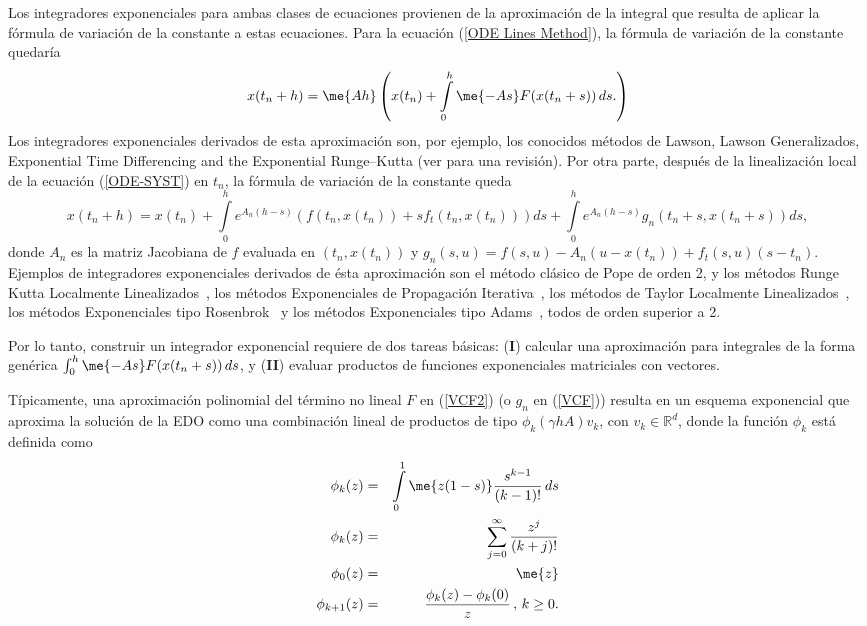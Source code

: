 Los integradores exponenciales para ambas clases de ecuaciones provienen de la aproximaci\'on de la integral
que resulta de aplicar la f\'ormula de variaci\'on de la constante a estas ecuaciones. Para la ecuaci\'on (\ref{ODE Lines Method}), la f\'ormula de variaci\'on
de la constante quedar\'ia
\begin{equation}
x(t_n+h)=\me{Ah}\left(x(t_n) +\int\limits_{0}^{h} \me{-As}F(x(t_n+s)) \,ds.\right) \label{VCF2}
\end{equation}
Los integradores exponenciales derivados de esta aproximaci\'on son, por ejemplo, los conocidos m\'etodos de Lawson, Lawson Generalizados, Exponential Time
Differencing and the Exponential Runge--Kutta (ver \cite{Berland07} para una revisi\'on). Por otra parte, después de la linealización local de la ecuaci\'on (\ref{ODE-SYST}) en $t_{n}$,  la f\'ormula de variaci\'on
de la constante queda
\begin{equation}
x(t_{n}+h)=x(t_{n})+\int\limits_{0}^{h}e^{A	_{n}(h-s)}(f(t_n,x(t_{n}))+sf_t(t_n,x(t_{n})))ds+\int\limits_{0}^{h}e^{A
	_{n}(h-s)}g_{n}(t_{n}+s,x(t_{n}+s))ds, \label{VCF}
\end{equation}
donde $A_{n}$ es la matriz Jacobiana de $f$ evaluada en $(t_n,x(t_{n}))$ y $g_{n}(s,u)=f(s,u)-A_{n}(u-x(t_n))+f_t(s,u)(s-t_n)$. Ejemplos de integradores exponenciales derivados de \'esta aproximaci\'on son el m\'etodo cl\'asico de Pope \cite{pope} de orden 2, y los m\'etodos Runge Kutta Localmente 
Linealizados~\cite{delaCruz06,Jimenez13,Jimenez14AMC}, los m\'etodos Exponenciales de Propagaci\'on 
Iterativa~\cite{tokman}, los m\'etodos de Taylor Localmente Linealizados~\cite{delaCruz07}, los
m\'etodos Exponenciales tipo Rosenbrok~\cite{ross} y los m\'etodos Exponenciales tipo Adams~\cite{adams}, todos de orden superior a 2.

Por lo tanto, construir un integrador exponencial requiere de dos tareas b\'asicas: (\textbf{I}) calcular una aproximaci\'on para integrales de la forma 
genérica $\int_{0}^{h} \me{-As}F(x(t_n+s)) \,ds$, y (\textbf{II}) evaluar productos de funciones exponenciales matriciales con vectores. 


Típicamente, una aproximaci\'on polinomial del t\'ermino no lineal $F$ en (\ref{VCF2}) (o $g_n$ en (\ref{VCF})) resulta en un esquema
exponencial que aproxima la soluci\'on de la EDO como una combinaci\'on lineal de productos de tipo $\phi_k(\gamma hA)v_k$, con 
$v_k\in \mathbb{R}^{d}$, donde la funci\'on $\phi_k$ está definida como
\begin{eqnarray}
    \phi_k(z) & = &\int\limits_{0}^{1}\me{z(1-s)}\frac{s^{k-1}}{(k-1)!}\,ds \nonumber \\
    \phi_k(z) & = &\sum\limits_{j=0}^{\infty}\frac{z^{j}}{(k+j)!}\label{DEF-PHI}\\
    \phi_0(z) &=& \me{z} \nonumber\\
    \phi_{k+1}(z) &=& \frac{\phi_k(z)-\phi_k(0)}{z}\,,\,k\geq0. \nonumber
\end{eqnarray}

